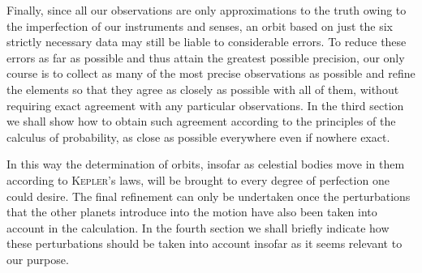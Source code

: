 Finally, since all our observations are only approximations to the truth owing to the imperfection of our instruments and senses, an orbit based on just the six strictly necessary data may still be liable to considerable errors. To reduce these errors as far as possible and thus attain the greatest possible precision, our only course is to collect as many of the most precise observations as possible and refine the elements so that they agree as closely as possible with all of them, without requiring exact agreement with any particular observations. In the third section we shall show how to obtain such agreement according to the principles of the calculus of probability, as close as possible everywhere even if nowhere exact.

In this way the determination of orbits, insofar as celestial bodies move in them according to \textsc{Kepler}'s laws, will be brought to every degree of perfection one could desire. The final refinement can only be undertaken once the perturbations that the other planets introduce into the motion have also been taken into account in the calculation. In the fourth section we shall briefly indicate how these perturbations should be taken into account insofar as it seems relevant to our purpose.

